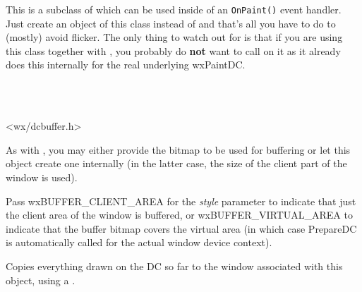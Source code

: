 This is a subclass of  which can be used
inside of an \texttt{OnPaint()} event handler. Just create an object of this class instead
of  and that's all you have to do to (mostly)
avoid flicker. The only thing to watch out for is that if you are using this
class together with , you probably
do \textbf{not} want to call  on it as it
already does this internally for the real underlying wxPaintDC.


\\
\\


<wx/dcbuffer.h>



\label{wxbufferedpaintdcctor}



As with , you may either provide the
bitmap to be used for buffering or let this object create one internally (in
the latter case, the size of the client part of the window is used).

Pass wxBUFFER\_CLIENT\_AREA for the {\it style} parameter to indicate that just the client area of
the window is buffered, or wxBUFFER\_VIRTUAL\_AREA to indicate that the buffer bitmap
covers the virtual area (in which case PrepareDC is automatically called for the actual window
device context).

\label{wxbufferedpaintdcdtor}

Copies everything drawn on the DC so far to the window associated with this
object, using a .


